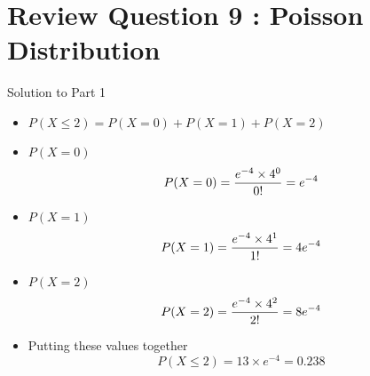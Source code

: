 \section{Review Question 9 :  Poisson Distribution}
Solution to Part 1
\begin{itemize}
\item $P(X\leq 2) = P(X = 0) + P(X = 1) + P(X = 2)$
\item $P(X = 0)$
 \[P(X = 0) = { e^{-4} \times 4^0\over 0!} = e^{-4}\]
\item $P(X = 1)$
\[P(X = 1) = { e^{-4} \times 4^1\over 1!} = 4e^{-4}\]
\item $P(X = 2)$
\[P(X = 2) = { e^{-4} \times 4^2\over 2!} = 8e^{-4}\]
\item Putting these values together
\[P(X\leq 2) = 13 \times e^{-4} = 0.238\]
\end{itemize}




\documentclass[]{article}
\usepackage{framed}
\usepackage{amsmath}
\usepackage{amssymb}
\usepackage{multicol}
\usepackage{graphicx}



